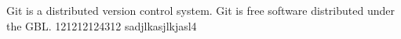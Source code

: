 Git is a distributed version control system.
Git is free software distributed under the GBL.
121212124312
sadjlkasjlkjasl4

